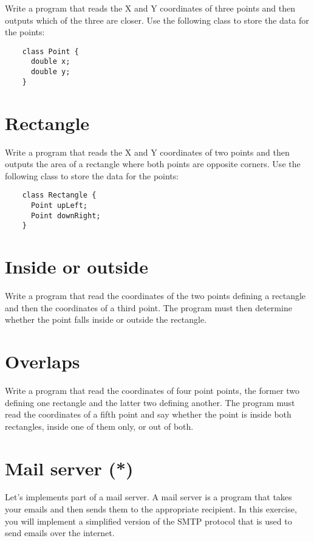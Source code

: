 \documentclass{article}
\begin{document}
Write a program that reads the X and Y coordinates of three points and
then outputs which of the three are closer. Use the following class
to store the data for the points: 

\begin{verbatim}
    class Point {
      double x;
      double y;
    }
\end{verbatim}

\section{Rectangle}
\label{sec:rectangle}

Write a program that reads the X and Y coordinates of two points and
then outputs the area of a rectangle where both points are opposite
corners. Use the following class
to store the data for the points: 

\begin{verbatim}
    class Rectangle {
      Point upLeft;
      Point downRight;
    }
\end{verbatim}

\section{Inside or outside}
\label{sec:inside-or-outside}

Write a program that read the coordinates of the two points defining a
rectangle and then the coordinates of a third point. The program must
then determine whether the point falls inside or outside the
rectangle. 

\section{Overlaps}
\label{sec:insideinside}

Write a program that read the coordinates of four point points, the
former two defining one rectangle and the latter two defining
another. The program must read the coordinates of a fifth point and
say whether the point is inside both rectangles, inside one of them
only, or out of both. 


\section{Mail server (*)}
\label{sec:mail-server}

Let's implements part of a mail server. A mail server is a program
that takes your emails and then sends them to the appropriate
recipient. In this exercise, you will implement a simplified version
of the SMTP protocol that is used to send emails over the internet. 
\end{document}
